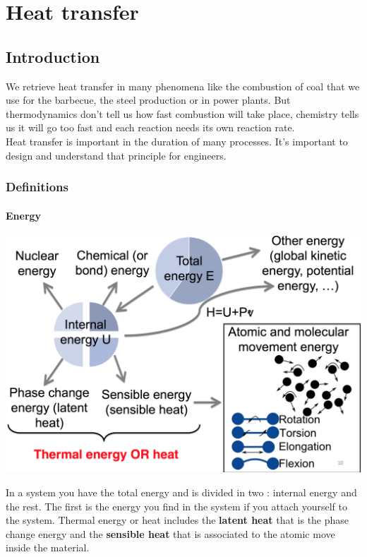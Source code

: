 
\chapter{Heat transfer}
\section{Introduction}
	We retrieve heat transfer in many phenomena like the combustion of coal that we use for the barbecue, the steel production or in power plants. But thermodynamics don't tell us how fast combustion will take place, chemistry tells us it will go too fast and each reaction needs its own reaction rate. \\
	Heat transfer is important in the duration of many processes. It's important to design and understand that principle for engineers. 
	
	\subsection{Definitions}
	\subsubsection{Energy}
		\begin{center}
		\includegraphics[scale=0.25]{ch3/1}
		\end{center}
		In a system you have the total energy and is divided in two : internal energy and the rest. The first is the energy you find in the system if you attach yourself to the system. Thermal energy or heat includes the \textbf{latent heat} that is the phase change energy and the \textbf{sensible heat} that is associated to the atomic move inside the material. 
		
